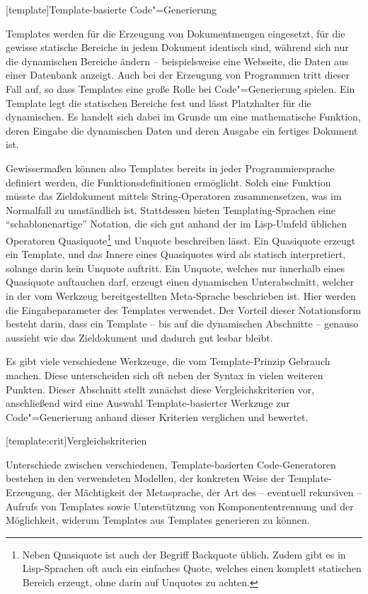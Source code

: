\documentclass[12pt, a4paper, bibgerm]{scrbook}
\newcommand\lchapter{}
\newcommand\lsection{}
\newcommand{\cgen}{Code"=Generierung}
\begin{document}
\lchapter[template]{Template-basierte \cgen{}}

Templates werden für die Erzeugung von Dokumentmengen eingesetzt, für
die gewisse statische Bereiche in jedem Dokument identisch sind, während
sich nur die dynamischen Bereiche ändern -- beispielsweise eine Webseite,
die Daten aus einer Datenbank anzeigt. Auch bei der Erzeugung von
Programmen tritt dieser Fall auf, so dass Templates eine große Rolle bei
\cgen{} spielen. Ein Template legt die statischen Bereiche fest und lässt
Platzhalter für die dynamischen. Es handelt sich dabei im Grunde um eine
mathematische Funktion, deren Eingabe die dynamischen Daten und deren
Ausgabe ein fertiges Dokument ist.

Gewissermaßen können also Templates bereits in jeder Programmiersprache
definiert werden, die Funktionsdefinitionen ermöglicht. Solch eine
Funktion müsste das Zieldokument mittels String-Operatoren
zusammensetzen, was im Normalfall zu umständlich ist. Stattdessen bieten
Templating-Sprachen eine ``schablonenartige'' Notation, die sich gut
anhand der im Lisp-Umfeld üblichen Operatoren Quasiquote\footnote{Neben
  Quasiquote ist auch der Begriff Backquote üblich. Zudem
  gibt es in Lisp-Sprachen oft auch ein einfaches Quote, welches einen
  komplett statischen Bereich erzeugt, ohne darin auf Unquotes zu
  achten.} und Unquote beschreiben lässt. Ein Quasiquote erzeugt ein
Template, und das Innere eines Quasiquotes wird als statisch
interpretiert, solange darin kein Unquote auftritt. Ein Unquote, welches
nur innerhalb eines Quasiquote auftauchen darf, erzeugt einen
dynamischen Unterabschnitt, welcher in der vom Werkzeug bereitgestellten
Meta-Sprache beschrieben ist. Hier werden die Eingabeparameter des
Templates verwendet. Der Vorteil dieser Notationsform besteht darin,
dass ein Template -- bis auf die dynamischen Abschnitte -- genauso
aussieht wie das Zieldokument und dadurch gut lesbar bleibt.

Es gibt viele verschiedene Werkzeuge, die vom Template-Prinzip Gebrauch
machen. Diese unterscheiden sich oft neben der Syntax in vielen weiteren
Punkten. Dieser Abschnitt stellt zunächst diese Vergleichskriterien vor,
anschließend wird eine Auswahl Template-basierter Werkzuge zur \cgen{}
anhand dieser Kriterien verglichen und bewertet.

\lsection[template:crit]{Vergleichskriterien}

Unterschiede zwischen verschiedenen, Template-basierten Code-Generatoren
bestehen in den verwendeten Modellen, der konkreten Weise der
Template-Erzeugung, der Mächtigkeit der Metasprache, der Art des --
eventuell rekursiven -- Aufrufs von Templates sowie Unterstützung von
Komponententrennung und der Möglichkeit, widerum Templates aus Templates
generieren zu können.  
\end{document}
